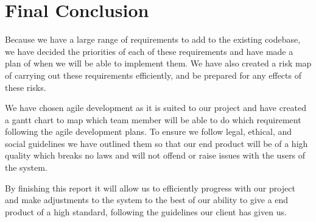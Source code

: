 
\section{Final Conclusion}
Because we have a large range of requirements to add to the existing codebase, we have decided the priorities of each of these requirements and have made a plan of when we will be able to implement them. We have also created a risk map of carrying out these requirements efficiently, and be prepared for any effects of these risks. 

We have chosen agile development as it is suited to our project and have created a gantt chart to map which team member will be able to do which requirement following the agile development plans. 
To ensure we follow legal, ethical, and social guidelines we have outlined them so that our end product will be of a high quality which breaks no laws and will not offend or raise issues with the users of the system.

By finishing this report it will allow us to efficiently progress with our project and make adjustments to the system to the best of our ability to give a end product of a high standard, following the guidelines our client has given us.

  
